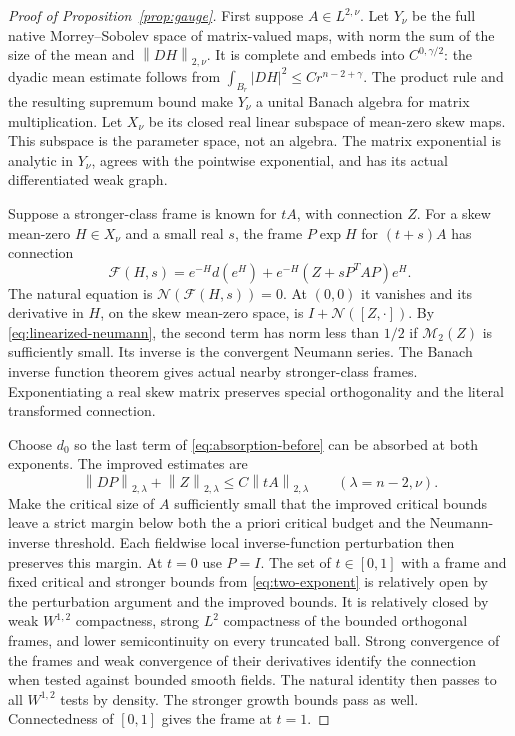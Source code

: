 \documentclass[11pt,a4paper]{article}
\numberwithin{equation}{section}
\theoremstyle{definition}
\theoremstyle{remark}
\newcommand{\M}{\mathcal M}
\newcommand{\norm}[1]{\left\lVert#1\right\rVert}
\begin{document}
\begin{proof}[Proof of Proposition~\ref{prop:gauge}]
First suppose $A\in L^{2,\nu}$. Let $Y_\nu$ be the full native
Morrey--Sobolev space of matrix-valued maps, with norm the sum of
the size of the mean and $\norm{DH}_{2,\nu}$. It is complete and embeds
into $C^{0,\gamma/2}$: the dyadic mean estimate follows from
$\int_{B_r}|DH|^2\leq Cr^{n-2+\gamma}$. The product rule and the
resulting supremum bound make $Y_\nu$ a unital Banach algebra for
matrix multiplication. Let $X_\nu$ be its closed real linear subspace
of mean-zero skew maps. This subspace is the parameter space, not an
algebra. The matrix exponential is analytic in $Y_\nu$, agrees with
the pointwise exponential, and has its actual differentiated weak graph.

Suppose a stronger-class frame is known for $tA$, with connection $Z$.
For a skew mean-zero $H\in X_\nu$ and a small real $s$, the frame
$P\exp H$ for $(t+s)A$ has connection
\[
 \mathcal F(H,s)=e^{-H}d(e^H)+e^{-H}(Z+sP^TAP)e^H.
\]
The natural equation is $\mathcal N(\mathcal F(H,s))=0$. At $(0,0)$
it vanishes and its derivative in $H$, on the skew mean-zero space, is
$I+\mathcal N([Z,\cdot])$. By
\eqref{eq:linearized-neumann}, the second term has norm less than
$1/2$ if $\M_2(Z)$ is sufficiently small. Its inverse is the
convergent Neumann series. The Banach inverse function theorem gives
actual nearby stronger-class frames. Exponentiating a real skew matrix
preserves special orthogonality and the literal transformed connection.

Choose $d_0$ so the last term of \eqref{eq:absorption-before} can be
absorbed at both exponents. The improved estimates are
\begin{equation}\label{eq:two-exponent}
 \norm{DP}_{2,\lambda}+\norm Z_{2,\lambda}
 \leq C\norm{tA}_{2,\lambda}\qquad(\lambda=n-2,\nu).
\end{equation}
Make the critical size of $A$ sufficiently small that the improved
critical bounds leave a strict margin below both the a priori critical
budget and the Neumann-inverse threshold. Each fieldwise local
inverse-function perturbation then preserves this margin. At $t=0$
use $P=I$. The set of $t\in[0,1]$ with a frame and fixed critical
and stronger bounds from \eqref{eq:two-exponent} is relatively open
by the perturbation argument and the improved bounds. It is relatively
closed by weak $W^{1,2}$ compactness, strong $L^2$ compactness of the
bounded orthogonal frames, and lower semicontinuity on every truncated
ball. Strong convergence of the frames and weak convergence of their
derivatives identify the connection when tested against bounded smooth
fields. The natural identity then passes to all $W^{1,2}$ tests by
density. The stronger growth bounds pass as well. Connectedness of
$[0,1]$ gives the frame at $t=1$.


\end{proof}
\end{document}
